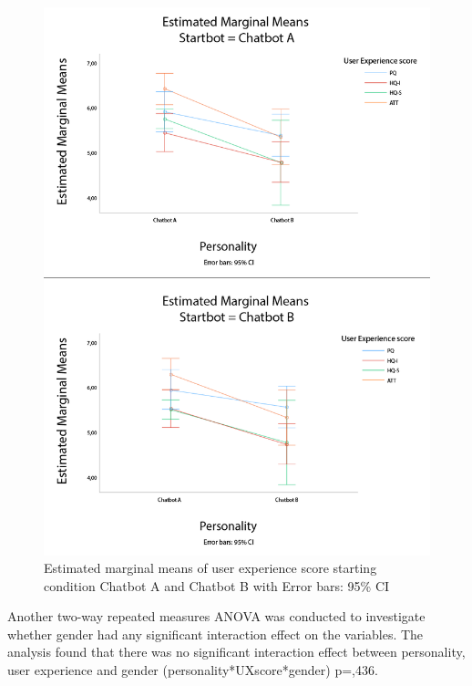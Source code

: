 \begin{figure}[h]
    \centering
    \includegraphics[scale=0.4]{figures/ErrorBarsStartbotAB.png}
    \caption{Estimated marginal means of user experience score starting condition Chatbot A and Chatbot B with Error bars: 95\% CI}
    \label{fig:errorUX}
\end{figure}

Another two-way repeated measures ANOVA was conducted to investigate whether gender had any significant interaction effect on the variables. The analysis found that there was no significant interaction effect between personality, user experience and gender (personality*UXscore*gender) p=,436.


